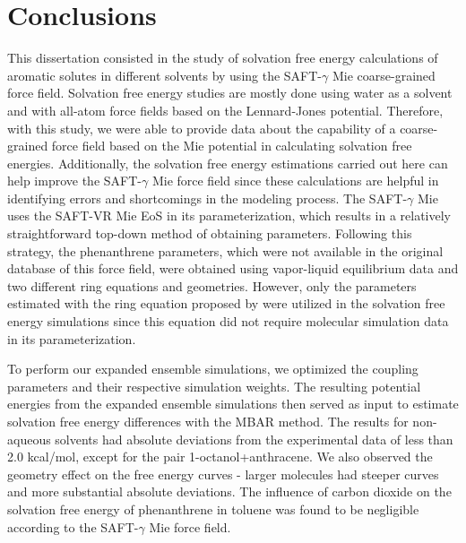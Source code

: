 \documentclass[
	12pt,				%
	openany,			%
	oneside,			%
	a4paper,			%
	english,			%
	brazil				%
	]{abntex2}
\providecommand{\DIFdelend}{}
\providecommand{\DIFdelend}{} %
\begin{document}
\DIFdelend \chapter{Conclusions} %

\label{Chapter6} 

This dissertation consisted in the study of solvation free energy calculations of aromatic solutes in different solvents by using the SAFT-$\gamma$ Mie coarse-grained force field. Solvation free energy studies are mostly done using water as a solvent and with all-atom force fields based on the Lennard-Jones potential. Therefore, with this study, we were able to provide data about the capability of a coarse-grained force field based on the Mie potential in calculating solvation free energies. Additionally, the solvation free energy estimations carried out here can help improve the SAFT-$\gamma$  Mie force field since these calculations are helpful in identifying errors and shortcomings in the modeling process. The SAFT-$\gamma$ Mie uses the SAFT-VR Mie EoS in its parameterization, which results in a relatively straightforward top-down method of obtaining parameters. Following this strategy, the phenanthrene parameters, which were not available in the original database of this force field, were obtained using vapor-liquid equilibrium data and two different ring equations and geometries. However, only the parameters estimated with the ring equation proposed by  were utilized in the solvation free energy simulations since this equation did not require molecular simulation data in its parameterization.

To perform our expanded ensemble simulations, we optimized the coupling parameters and their respective simulation weights. The resulting potential energies from the expanded ensemble simulations then served as input to estimate solvation free energy differences with the MBAR method. The results for non-aqueous solvents had absolute deviations from the experimental
data of less than 2.0 kcal/mol, except for the pair 1-octanol+anthracene. We also observed the geometry effect on the free energy curves - larger molecules had steeper curves and more substantial absolute deviations. The influence of carbon dioxide on the solvation free energy of phenanthrene in toluene was found to be negligible according to the SAFT-$\gamma$ Mie force field. 
\end{document}
